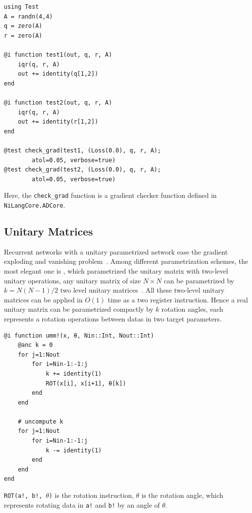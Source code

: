 \documentclass[aps,twocolumn,longbibliography,english,superscriptaddress,prr]{revtex4-1}
\newcommand{\<}{\langle}
\renewcommand{\>}{\rangle}
\theoremstyle{definition}\newtheorem{definition}{\textit{Definition}}
\begin{document}
\begin{minipage}{.44\textwidth}
\begin{lstlisting}
using Test
A = randn(4,4)
q = zero(A)
r = zero(A)

@i function test1(out, q, r, A)
    iqr(q, r, A)
    out += identity(q[1,2])
end

@i function test2(out, q, r, A)
    iqr(q, r, A)
    out += identity(r[1,2])
end

@test check_grad(test1, (Loss(0.0), q, r, A);
        atol=0.05, verbose=true)
@test check_grad(test2, (Loss(0.0), q, r, A);
        atol=0.05, verbose=true)
\end{lstlisting}
\end{minipage}

Here, the \texttt{check\_grad} function is a gradient checker function defined in \texttt{NiLangCore.ADCore}.

\subsection{Unitary Matrices}
Recurrent networks with a unitary parametrized network ease the gradient exploding and vanishing problem~\cite{Arjovsky2015,Wisdom2016,Li2016}.
Among different parametrization schemes, the most elegant one is \cite{Li2016}, which parametrized the unitary matrix with two-level unitary operations, any unitary matrix of size $N\times N$ can be parametrized by $k = N(N-1)/2$ two level unitary matrices~\cite{Li2013}. All these two-level unitary matrices can be applied in $O(1)$ time as a two register instruction.
Hence a real unitary matrix can be parametrized compactly by $k$ rotation angles, each represents a rotation operations between datas in two target parameters.


\begin{minipage}{.44\textwidth}
\begin{lstlisting}
@i function umm!(x, θ, Nin::Int, Nout::Int)
    @anc k = 0
    for j=1:Nout
        for i=Nin-1:-1:j
            k += identity(1)
            ROT(x[i], x[i+1], θ[k])
        end
    end

    # uncompute k
    for j=1:Nout
        for i=Nin-1:-1:j
            k -= identity(1)
        end
    end
end
\end{lstlisting}
\end{minipage}

\texttt{ROT(a!, b!, $\theta$)} is the rotation instruction, \texttt{$\theta$} is the rotation angle, which represents rotating data in \texttt{a!} and \texttt{b!} by an angle of $\theta$.
\end{document}
